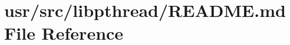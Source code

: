 \hypertarget{usr_2src_2libpthread_2README_8md}{\section{usr/src/libpthread/\+R\+E\+A\+D\+M\+E.md File Reference}
\label{usr_2src_2libpthread_2README_8md}
}
